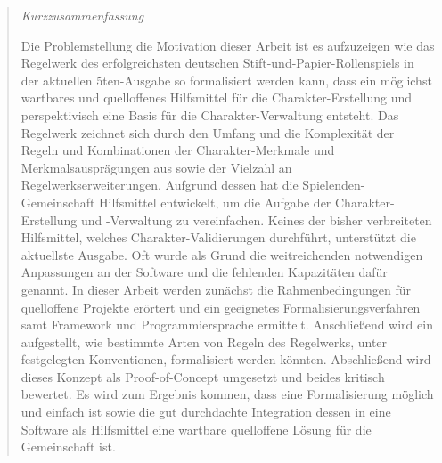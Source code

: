 \begin{abstract} %
\begin{center}

\begin{minipage}{12cm}

    {\Large\textit{Kurzzusammenfassung}}

    Die Problemstellung \bzw die Motivation dieser Arbeit ist es aufzuzeigen wie das Regelwerk des erfolgreichsten deutschen Stift-und-Papier-Rollenspiels  in der aktuellen 5ten-Ausgabe so formalisiert werden kann, dass ein möglichst wartbares und quelloffenes Hilfsmittel für die Charakter-Erstellung und perspektivisch eine Basis für die Charakter-Verwaltung entsteht.
    Das Regelwerk zeichnet sich \insb durch den Umfang und die Komplexität der Regeln und Kombinationen der Charakter-Merkmale und Merkmalsausprägungen aus sowie der Vielzahl an Regelwerkserweiterungen.
    Aufgrund dessen hat die Spielenden-Gemeinschaft Hilfsmittel entwickelt, um die Aufgabe der Charakter-Erstellung und -Verwaltung zu vereinfachen.
    Keines der bisher verbreiteten Hilfsmittel, welches Charakter-Validierungen durchführt, unterstützt die aktuellste Ausgabe.
    Oft wurde als Grund die weitreichenden notwendigen Anpassungen an der Software und die fehlenden Kapazitäten dafür genannt.
    In dieser Arbeit werden zunächst die Rahmenbedingungen für quelloffene Projekte erörtert und ein geeignetes Formalisierungsverfahren samt Framework und Programmiersprache ermittelt.
    Anschließend wird ein  aufgestellt, wie bestimmte Arten von Regeln des Regelwerks, unter festgelegten Konventionen, formalisiert werden könnten.
    Abschließend wird dieses Konzept als Proof-of-Concept umgesetzt und beides kritisch bewertet.
    Es wird zum Ergebnis kommen, dass eine Formalisierung möglich und einfach ist sowie die gut durchdachte Integration dessen in eine Software als Hilfsmittel eine wartbare quelloffene Lösung für die Gemeinschaft ist.


\end{minipage}
\end{center}
\end{abstract}

